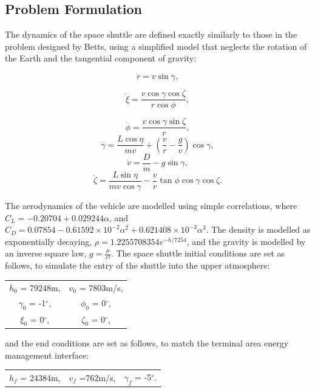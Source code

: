 \subsection{Problem Formulation}

The dynamics of the space shuttle are defined exactly similarly to those in the problem designed by Betts\cite{Betts2009}, using a simplified model that neglects the rotation of the Earth and the tangential component of gravity:

\begin{equation}
\dot{r} = v \sin \gamma,
\end{equation}

\begin{equation}
\dot{\xi} = \frac{v\cos \gamma \cos \zeta}{r \cos \phi},
\end{equation}

\begin{equation}
\dot{\phi} = \frac{v\cos\gamma\sin\zeta}{r},
\end{equation}
\begin{equation}
\dot{\gamma} = \frac{L \cos\eta}{mv} + (\frac{v}{r}-\frac{g}{v})\cos\gamma,
\end{equation}
\begin{equation}
\dot{v} = \frac{D}{m}-g\sin\gamma,
\end{equation}
\begin{equation}
\dot{\zeta} = \frac{L  \sin\eta}{mv \cos \gamma}-\frac{v}{r}\tan\phi\cos\gamma\cos\zeta.
\end{equation}

The aerodynamics of the vehicle are modelled using simple correlations, where $C_L = −0.20704 + 0.029244\alpha$, and $C_D = 0.07854 -0.61592\times10^{-2}\alpha^2 + 0.621408\times10^{-3}\alpha^3$. The density is modelled as exponentially decaying, $\rho = 1.2255708354e^{-h/7254}$, and the gravity is modelled by an inverse square law, $g = \frac{\mu}{r^2}$.
The space shuttle initial conditions are set as follows\cite{Betts2009}, to simulate the entry of the shuttle into the upper atmosphere:
\begin{table}[H]
	\centering
\begin{tabular}{c c}
  $h_0$ =  79248m, & $v_0$ = 7803m/s, \\ 
  $\gamma_0$ =  -1$^\circ$, & $\phi_0$ =  0$^\circ$,\\ 
 $\xi_0$ =  0$^\circ$, & $\zeta_0$ =  0$^\circ$,\\ 
\end{tabular} 
\end{table}
and the end conditions are set as follows\cite{Betts2009}, to match the terminal area energy management interface:
\begin{table}[H]
	\centering
	\begin{tabular}{ c c c}
		   $h_f$ =  24384m, &  $v_f$ =762m/s, & $\gamma_f$ =  -5$^\circ$.\\ 
		
		
	\end{tabular} 
\end{table}

